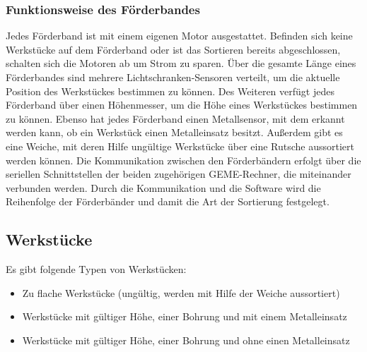 \documentclass[oneside,a4paper,titlepage]{scrartcl} %
\begin{document}
\subsubsection{Funktionsweise des Förderbandes}
Jedes Förderband ist mit einem eigenen Motor ausgestattet. Befinden sich keine Werkstücke auf dem Förderband oder ist das Sortieren bereits abgeschlossen, schalten sich die Motoren ab um Strom zu sparen.\newline
\newline
Über die gesamte Länge eines Förderbandes sind mehrere Lichtschranken-Sensoren verteilt, um die aktuelle Position des Werkstückes bestimmen zu können.\newline
\newline
Des Weiteren verfügt jedes Förderband über einen Höhenmesser, um die Höhe eines Werkstückes bestimmen zu können.\newline
\newline
Ebenso hat jedes Förderband einen Metallsensor, mit dem erkannt werden kann, ob ein Werkstück einen Metalleinsatz besitzt.\newline
\newline
Außerdem gibt es eine Weiche, mit deren Hilfe ungültige Werkstücke über eine Rutsche aussortiert werden können.\newline
\newline
Die Kommunikation zwischen den Förderbändern erfolgt über die seriellen Schnittstellen der beiden zugehörigen GEME-Rechner, die miteinander verbunden werden.\newline
\newline
Durch die Kommunikation und die Software wird die Reihenfolge der Förderbänder und damit die Art der Sortierung festgelegt.

\subsection{Werkstücke}
Es gibt folgende Typen von Werkstücken:
\begin{itemize}
    \item Zu flache Werkstücke (ungültig, werden mit Hilfe der Weiche aussortiert)
    \item Werkstücke mit gültiger Höhe, einer Bohrung und mit einem Metalleinsatz
    \item Werkstücke mit gültiger Höhe, einer Bohrung und ohne einen Metalleinsatz
\end{itemize}

\newpage
\end{document}

